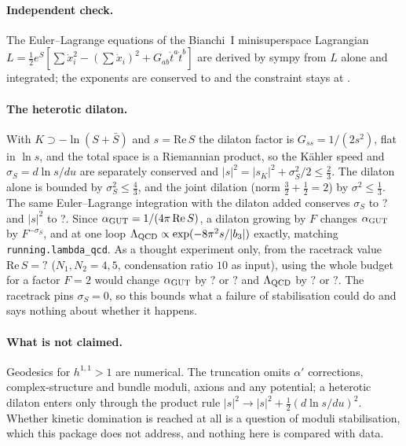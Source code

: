 \documentclass[11pt,a4paper]{article}
\providecommand{\CFDilatonELSigmaDev}{?}\providecommand{\CFDilatonELSpeedDev}{?}
\providecommand{\CFRacetrackSzero}{?}\providecommand{\CFRacetrackAlphaDown}{?}\providecommand{\CFRacetrackAlphaUp}{?}
\providecommand{\CFRacetrackLambdaDown}{?}\providecommand{\CFRacetrackLambdaUp}{?}
\begin{document}
\paragraph{Independent check.} The Euler--Lagrange equations of the Bianchi~I minisuperspace Lagrangian
$L=\tfrac12e^{S}[\sum\dot x_i^2-(\sum\dot x_i)^2+G_{ab}\dot t^a\dot t^b]$ are derived by sympy from $L$ alone and
integrated; the exponents are conserved to \CFELExponentDev{} and the constraint stays at \CFELConstraint.

\paragraph{The heterotic dilaton.} With $K\supset-\ln(S+\bar S)$ and $s=\mathrm{Re}\,S$ the dilaton factor is
$G_{ss}=1/(2s^2)$, flat in $\ln s$, and the total space is a Riemannian product, so the Kähler speed and
$\sigma_S=d\ln s/du$ are separately conserved and $|s|^2=|s_K|^2+\sigma_S^2/2\le\tfrac23$. The dilaton alone is bounded
by $\sigma_S^2\le\tfrac43$, and the joint dilation (norm $\tfrac32+\tfrac12=2$) by $\sigma^2\le\tfrac13$. The same
Euler--Lagrange integration with the dilaton added conserves $\sigma_S$ to \CFDilatonELSigmaDev{} and $|s|^2$ to
\CFDilatonELSpeedDev. Since $\alpha_{\rm GUT}=1/(4\pi\,\mathrm{Re}\,S)$, a dilaton growing by $F$ changes
$\alpha_{\rm GUT}$ by $F^{-\sigma_S}$, and at one loop $\Lambda_{\rm QCD}\propto\exp(-8\pi^2 s/|b_3|)$ exactly, matching
\texttt{running.lambda\_qcd}. As a thought experiment only, from the racetrack value $\mathrm{Re}\,S=\CFRacetrackSzero$
($N_1,N_2=4,5$, condensation ratio $10$ as input), using the whole budget for a factor $F=2$ would change
$\alpha_{\rm GUT}$ by $\CFRacetrackAlphaUp$ or $\CFRacetrackAlphaDown$ and $\Lambda_{\rm QCD}$ by $\CFRacetrackLambdaUp$ or
$\CFRacetrackLambdaDown$. The racetrack pins $\sigma_S=0$, so this bounds what a failure of stabilisation could do and
says nothing about whether it happens.

\paragraph{What is not claimed.} Geodesics for $h^{1,1}>1$ are numerical. The truncation omits $\alpha'$ corrections,
complex-structure and bundle moduli, axions and any potential; a heterotic dilaton enters only through the product
rule $|s|^2\to|s|^2+\tfrac12(d\ln s/du)^2$. Whether kinetic domination is reached at all is a question of moduli
stabilisation, which this package does not address, and nothing here is compared with data.
\end{document}
